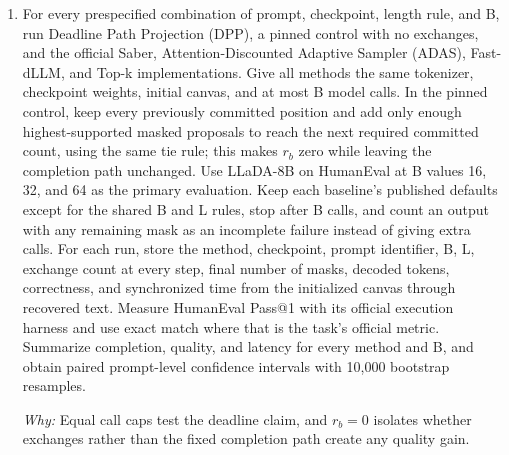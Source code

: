 \documentclass[10pt,a4paper]{article}
\begin{document}
\begin{enumerate}[leftmargin=*,start=1]
  \item For every prespecified combination of prompt, checkpoint, length rule, and B, run Deadline Path Projection (DPP), a pinned control with no exchanges, and the official Saber, Attention-Discounted Adaptive Sampler (ADAS), Fast-dLLM, and Top-k implementations. Give all methods the same tokenizer, checkpoint weights, initial canvas, and at most B model calls. In the pinned control, keep every previously committed position and add only enough highest-supported masked proposals to reach the next required committed count, using the same tie rule;\allowbreak{} this makes \(r_{b}\) zero while leaving the completion path unchanged. Use LLaDA-8B on HumanEval at B values 16, 32, and 64 as the primary evaluation. Keep each baseline's published defaults except for the shared B and L rules, stop after B calls, and count an output with any remaining mask as an incomplete failure instead of giving extra calls. For each run, store the method, checkpoint, prompt identifier, B, L, exchange count at every step, final number of masks, decoded tokens, correctness, and synchronized time from the initialized canvas through recovered text. Measure HumanEval Pass@1 with its official execution harness and use exact match where that is the task's official metric. Summarize completion, quality, and latency for every method and B, and obtain paired prompt-level confidence intervals with 10,000 bootstrap resamples.
\par\emph{Why:} Equal call caps test the deadline claim, and \(r_{b}=0\) isolates whether exchanges rather than the fixed completion path create any quality gain.
\end{enumerate}
\end{document}
